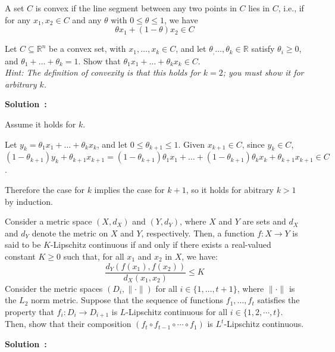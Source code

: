 \documentclass{article}
\newcounter{problem}[section]
\newenvironment{solution}[1][]
    {\par\medskip \begin{mdframed}\textbf{Solution~\Alph{problem}#1:} \begin{em}}
    {\end{em}\medskip\end{mdframed}\medskip}
\begin{document}
A set $C$ is convex if the line segment between any two points in $C$ lies in $C$, i.e.,
if for any $x_1, x_2 \in C$ and any $\theta$ with $0 \leq \theta \leq 1$, we have
\[\theta x_1  + (1 - \theta)x_2 \in C\]

\problem[5] Let $C \subseteq \mathbb{R}^n$ be a convex set, with $x_1, \dots, x_k\in C$, and let $\theta_, \dots, \theta_k \in \mathbb{R}$ satisfy $\theta_i\geq 0$, and 
$\theta_1 + \dots + \theta_k = 1$. Show that $\theta_1 x_1 + \dots + \theta_k x_k \in C$. \\
\emph{Hint: The definition of convexity is that this holds for $k = 2$; you must show it for arbitrary $k$.}\\

\begin{solution}
  Assume it holds for $k$.

  Let $y_k = \theta_1 x_1 + \dots + \theta_k x_k$, and let $0 \leq \theta_{k+1} \leq 1$.
  Given $x_{k+1} \in C$, since $y_k \in C$, $(1 - \theta_{k+1}) y_k + \theta_{k+1} x_{k+1} = (1 - \theta_{k+1}) \theta_1 x_1 + \dots + (1 - \theta_{k+1}) \theta_k x_k + \theta_{k+1} x_{k+1} \in C$.

  Therefore the case for $k$ implies the case for $k+1$, so it holds for abitrary $k > 1$ by induction.
\end{solution}

\vspace{0.5cm}

 Consider a metric space $(X, d_X)$ and $(Y, d_Y)$, where $X$ and $Y$ are sets and $d_X$ and $d_Y$ denote the metric on $X$ and $Y$, respectively. Then, a function $f:X\to Y$ is said to be $K$-Lipschitz continuous if and only if there exists a real-valued constant $K\geq 0$ such that, for all $x_1$ and $x_2$ in $X$, we have:
\[\frac{d_Y(f(x_1), f(x_2))}{d_X(x_1, x_2)} \leq K\]
Consider the metric spaces $(D_i, \|\cdot\|)$ for all $i\in\{1, \dots, t+1\}$, where $\|\cdot\|$ is the $L_2$ norm metric. Suppose that the sequence of functions $f_1, \dots, f_t$ satisfies the property that $f_i: D_i \to D_{i+1}$ is $L$-Lipschitz continuous for all $i \in \{1, 2, \cdots, t\}$. Then, show that their composition $(f_t \circ f_{t-1} \circ \cdots \circ f_1)$ is $L^t$-Lipschitz continuous.\\

\begin{solution}
    
\end{solution}
\end{document}
